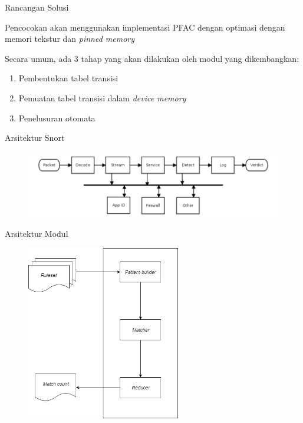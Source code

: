 \documentclass[10pt]{beamer}
\begin{document}
\begin{frame}{Rancangan Solusi}
    
    Pencocokan akan menggunakan implementasi PFAC dengan optimasi dengan memori tekstur dan \emph{pinned memory}

    Secara umum, ada 3 tahap yang akan dilakukan oleh modul yang dikembangkan:
    \begin{enumerate}
        
        \item Pembentukan tabel transisi
        
        \item Pemuatan tabel transisi dalam \emph{device memory}
        
        \item Penelusuran otomata

    \end{enumerate}
\end{frame}

\begin{frame}{Arsitektur Snort}
    \begin{figure}
        \centering
        \includegraphics[width=1.0\textwidth]{../src/resources/snort3.png}
    \end{figure}
\end{frame}

\begin{frame}{Arsitektur Modul}
    \begin{figure}
        \centering
        \includegraphics[width=0.6\textwidth]{../src/resources/module-arch.png}
    \end{figure}
\end{frame}
\end{document}

